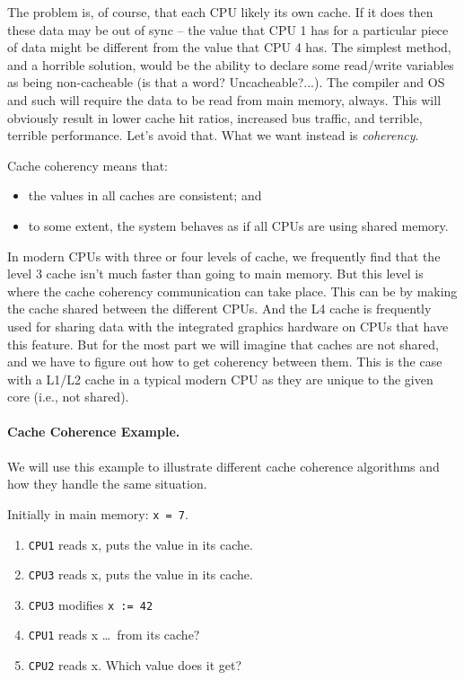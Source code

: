 \documentclass[a4paper]{report}
\begin{document}
The problem is, of course, that each CPU likely its own cache. If it does then these data may be out of sync -- the value that CPU 1 has for a particular piece of data might be different from the value that CPU 4 has. The simplest method, and a horrible solution, would be the ability to declare some read/write variables as being non-cacheable (is that a word? Uncacheable?...). The compiler and OS and such will require the data to be read from main memory, always. This will obviously result in lower cache hit ratios, increased bus traffic, and terrible, terrible performance. Let's avoid that. What we want instead is \textit{coherency}.

Cache coherency means that:
  \begin{itemize}
    \item the values in all caches are consistent; and
    \item to some extent, the system behaves as if all CPUs are using shared memory.
  \end{itemize}
  
In modern CPUs with three or four levels of cache, we frequently find that the level 3 cache isn't much faster than going to main memory. But this level is where the cache coherency communication can take place. This can be by making the cache shared between the different CPUs. And the L4 cache is frequently used for sharing data with the integrated graphics hardware on CPUs that have this feature. But for the most part we will imagine that caches are not shared, and we have to figure out how to get coherency between them. This is the case with a L1/L2 cache in a typical modern CPU as they are unique to the given core (i.e., not shared).
  
\paragraph{Cache Coherence Example.} We will use this example to illustrate
different cache coherence algorithms and how they handle the same situation.

Initially in main memory: {\tt x = 7}.

  \begin{enumerate}
    \item {\tt CPU1} reads x, puts the value in its cache.
    \item {\tt CPU3} reads x, puts the value in its cache.
    \item {\tt CPU3} modifies {\tt x := 42}
    \item {\tt CPU1} reads x \ldots ~from its cache?
    \item {\tt CPU2} reads x. Which value does it get?
  \end{enumerate}
\end{document}

